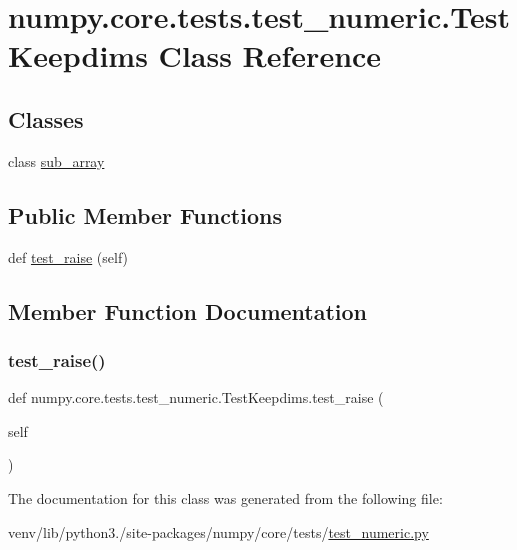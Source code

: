 \hypertarget{classnumpy_1_1core_1_1tests_1_1test__numeric_1_1TestKeepdims}{}\section{numpy.\+core.\+tests.\+test\+\_\+numeric.\+Test\+Keepdims Class Reference}
\label{classnumpy_1_1core_1_1tests_1_1test__numeric_1_1TestKeepdims}
\subsection*{Classes}
\begin{DoxyCompactItemize}
\item 
class \hyperlink{classnumpy_1_1core_1_1tests_1_1test__numeric_1_1TestKeepdims_1_1sub__array}{sub\+\_\+array}
\end{DoxyCompactItemize}
\subsection*{Public Member Functions}
\begin{DoxyCompactItemize}
\item 
def \hyperlink{classnumpy_1_1core_1_1tests_1_1test__numeric_1_1TestKeepdims_ab1806044f9ac653542813164b22a7ae8}{test\+\_\+raise} (self)
\end{DoxyCompactItemize}


\subsection{Member Function Documentation}
\mbox{\label{classnumpy_1_1core_1_1tests_1_1test__numeric_1_1TestKeepdims_ab1806044f9ac653542813164b22a7ae8}} 
\subsubsection{\texorpdfstring{test\+\_\+raise()}{test\_raise()}}
{\footnotesize\ttfamily def numpy.\+core.\+tests.\+test\+\_\+numeric.\+Test\+Keepdims.\+test\+\_\+raise (\begin{DoxyParamCaption}\item[{}]{self }\end{DoxyParamCaption})}



The documentation for this class was generated from the following file\+:\begin{DoxyCompactItemize}
\item 
venv/lib/python3./site-\/packages/numpy/core/tests/\hyperlink{core_2tests_2test__numeric_8py}{test\+\_\+numeric.\+py}\end{DoxyCompactItemize}
